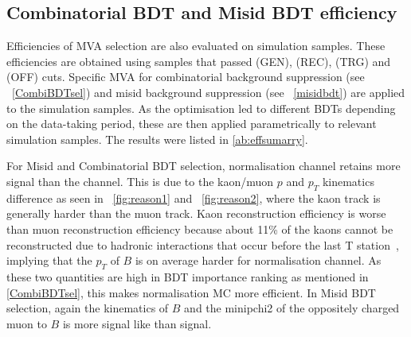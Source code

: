 \subsection{Combinatorial BDT and Misid BDT efficiency}
 Efficiencies of MVA selection are also evaluated on simulation samples. These efficiencies are obtained using samples that passed (GEN), (REC), (TRG) and (OFF) cuts. Specific MVA for combinatorial background suppression (see ~\autoref{CombiBDTsel}) and misid background suppression (see ~\autoref{misidbdt}) are applied to the simulation samples. As the optimisation led to different BDTs depending on the data-taking period, these are then applied parametrically to relevant simulation samples. The results were listed in \autoref{ab:effsumarry}.

For Misid and Combinatorial BDT selection, normalisation \bjpsimumuk channel retains more signal than the \Bmumumu channel. This is due to the kaon/muon $p$ and $p_{T}$ kinematics difference as seen in ~\autoref{fig:reason1} and ~\autoref{fig:reason2}, where the kaon track is generally harder than the muon track. Kaon reconstruction efficiency is worse than muon reconstruction efficiency because about 11\% of the kaons cannot be reconstructed due to hadronic interactions that occur before the last T station~\cite{LHCb-DP-2013-002}, implying that the $p_{T}$ of $B$ is on average harder for normalisation channel. As these two quantities are high in BDT importance ranking as mentioned in \autoref{CombiBDTsel}, this makes normalisation MC more efficient. In Misid BDT selection, again the kinematics of $B$ and the \gls{minipchi2} of the oppositely charged muon to $B$ is more signal like than signal.



